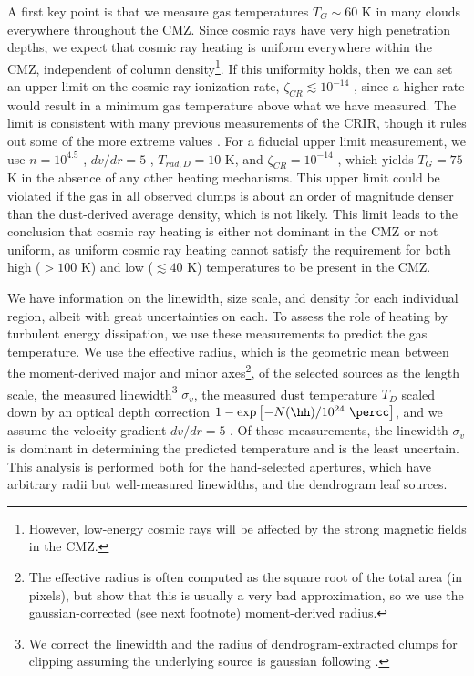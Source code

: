 A first key point is that we measure gas temperatures $T_G\sim60$ K in many
clouds everywhere throughout the CMZ.  Since cosmic rays have very high
penetration depths, we expect that cosmic ray heating is uniform
everywhere within the CMZ, independent of column density\footnote{However,
low-energy cosmic rays will be affected by the strong magnetic fields in the
CMZ.}.  If this uniformity
holds, then we can set an upper limit on the cosmic ray ionization rate,
$\zeta_{CR} \lesssim 10^{-14}$ \pers, since a higher rate would result in a
minimum gas temperature above what we have measured.  The limit is consistent
with many previous measurements of the CRIR, though
it rules out some of the more extreme values \citep{Yusef-Zadeh2013b,Goto2013a}.
For a fiducial upper limit measurement, we use $n=10^{4.5}$ \percc, $dv/dr=5$
\kms \perpc, $T_{rad,D}=10$ K, and $\zeta_{CR} = 10^{-14}$ \pers, which
yields $T_{G}=75$ K in the absence of any other heating mechanisms.  This
upper limit could be violated if the gas in all observed clumps is about an
order of magnitude denser than the dust-derived average density, which is not
likely.  This limit leads to the conclusion that cosmic ray heating is either
not dominant in the CMZ or not uniform, as uniform cosmic ray heating cannot
satisfy the requirement for both high ($>100$ K) and low ($\lesssim40$ K)
temperatures to be present in the CMZ.



We have information on the linewidth, size scale, and density for each
individual region, albeit with great uncertainties on each. To assess the role
of heating by turbulent energy dissipation,  we use these measurements to
predict the gas temperature.  We use the effective radius,
which is the geometric mean between the moment-derived major and minor
axes\footnote{The effective radius is often computed as the square root of the
total area (in pixels), but \citet{Rosolowsky2006a} show that this is usually a
very bad approximation, so we use the gaussian-corrected (see next footnote)
moment-derived radius.}, of the selected sources as the length scale, the
measured linewidth\footnote{We correct the linewidth and the radius of
dendrogram-extracted clumps for clipping assuming the underlying source is
gaussian following \citet[][Appendix B]{Rosolowsky2005b}.}
$\sigma_v$, the
measured dust temperature $T_{D}$ scaled down by an optical depth correction
$1-\exp\left[-N(\hh)/10^{24}~\percc\right]$, and we assume the velocity gradient
$dv/dr = 5$ \kms \perpc.  Of these measurements, the linewidth $\sigma_v$ is
dominant in determining the predicted temperature and is the least uncertain.
This analysis is performed both for the hand-selected apertures, which have
arbitrary radii but well-measured linewidths, and the dendrogram leaf sources.

